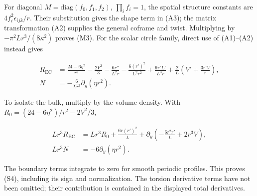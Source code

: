 For diagonal $M=\mathrm{diag}(f_0,f_1,f_2)$, $\prod_i f_i=1$, the spatial structure constants are $4f_i^2\epsilon_{ijk}/r$. Their substitution gives the shape term in (A3); the matrix transformation (A2) supplies the general coframe and twist. Multiplying by $-\pi^2Lr^3/(8\kappa^2)$ proves (M3). For the scalar circle family, direct use of (A1)--(A2) instead gives

\begin{equation}\tag{A4}\label{eq:A4}
\begin{aligned}
R_{\mathrm{EC}}
&=\frac{24-6\eta^2}{r^2}-\frac{2V^2}{3}
-\frac{6r''}{L^2r}-\frac{6(r')^2}{L^2r^2}
+\frac{6r'L'}{L^3r}
+\frac{2}{L}\left(V'+\frac{3r'V}{r}\right),\\
N&=-\frac{6}{Lr^3}\partial_y(\eta r^2).
\end{aligned}
\end{equation}

To isolate the bulk, multiply by the volume density. With $R_0=(24-6\eta^2)/r^2-2V^2/3$,

\begin{equation}\tag{A5}\label{eq:A5}
\begin{aligned}
Lr^3R_{\mathrm{EC}}
&=Lr^3R_0+\frac{6r(r')^2}{L}
+\partial_y\left(-\frac{6r^2r'}{L}+2r^3V\right),\\
Lr^3N&=-6\partial_y(\eta r^2).
\end{aligned}
\end{equation}

The boundary terms integrate to zero for smooth periodic profiles. This proves (S4), including its sign and normalization. The torsion derivative terms have not been omitted; their contribution is contained in the displayed total derivatives.
